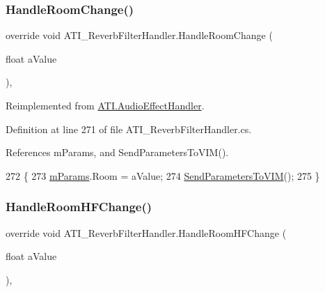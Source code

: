 \subsubsection{\texorpdfstring{Handle\+Room\+Change()}{HandleRoomChange()}}
{\footnotesize\ttfamily override void A\+T\+I\+\_\+\+Reverb\+Filter\+Handler.\+Handle\+Room\+Change (\begin{DoxyParamCaption}\item[{float}]{a\+Value }\end{DoxyParamCaption})\hspace{0.3cm}{\ttfamily [protected]}, {\ttfamily [virtual]}}



Reimplemented from \hyperlink{class_a_t_i_1_1_audio_effect_handler_a416ae6f8266224b0d6cd71cba1020001}{A\+T\+I.\+Audio\+Effect\+Handler}.



Definition at line 271 of file A\+T\+I\+\_\+\+Reverb\+Filter\+Handler.\+cs.



References m\+Params, and Send\+Parameters\+To\+V\+I\+M().


\begin{DoxyCode}
272     \{
273         \hyperlink{class_a_t_i___reverb_filter_handler_a034260fbce2052b42bceddc891632347}{mParams}.Room = aValue;
274         \hyperlink{class_a_t_i___reverb_filter_handler_aacb469dc3038fca616d638f6a5a04a30}{SendParametersToVIM}();
275     \}
\end{DoxyCode}
\mbox{\label{class_a_t_i___reverb_filter_handler_a587ab9596231ed2ff9e3628bbc59d510}} 
\subsubsection{\texorpdfstring{Handle\+Room\+H\+F\+Change()}{HandleRoomHFChange()}}
{\footnotesize\ttfamily override void A\+T\+I\+\_\+\+Reverb\+Filter\+Handler.\+Handle\+Room\+H\+F\+Change (\begin{DoxyParamCaption}\item[{float}]{a\+Value }\end{DoxyParamCaption})\hspace{0.3cm}{\ttfamily [protected]}, {\ttfamily [virtual]}}



